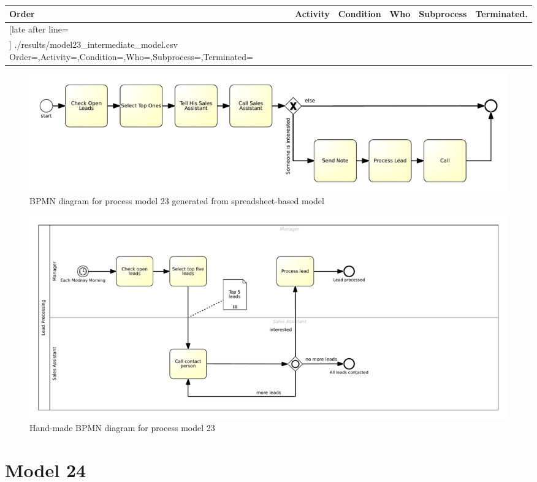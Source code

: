{\scriptsize
	\begin{longtable}{|p{0.03 \hsize}|p{0.25 \hsize}|p{0.15 \hsize}|p{0.2 \hsize}|p{0.1 \hsize}|p{0.1 \hsize}|}
		\hline
		Order & Activity & Condition & Who & Subprocess & Terminated.
		\\\hline\hline
		\csvreader[late after line=\\\hline]
		{./results/model23_intermediate_model.csv}
		{Order=\Order,Activity=\Activity,Condition=\Condition,Who=\Who,Subprocess=\Subprocess,Terminated=\Terminated}
		{\Order & \Activity & \Condition & \Who & \Subprocess & \Terminated}
		\caption{Spreadsheet-based description for process model 23}
		\label{csv:model23}
	\end{longtable}
}

\begin{figure}[H]
	\centering
	\includegraphics[width=\hsize]{./generated_bpmn/model23.pdf}
	\caption{BPMN diagram for process model 23 generated from spreadsheet-based model}
	\label{bpmn:generated_model23}
\end{figure}

\begin{figure}[H]
	\centering
	\includegraphics[width=\hsize]{./bpmn/model23.pdf}
	\caption{Hand-made BPMN diagram for process model 23}
	\label{bpmn:model23}
\end{figure}

\section{Model 24}
\begin{tcolorbox}[
	breakable,
	arc=0mm,
	left=1pt,
	right = 1pt,
	boxrule=0mm,
	colback = {white},
	]
	\texttt{}
\end{tcolorbox}
\label{txt:model24}

